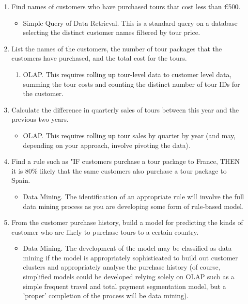 \documentclass{scrreprt}
\begin{document}
\begin{enumerate}
	\item Find names of customers who have purchased tours that cost less than €500.
	\begin{itemize}
		\item Simple Query of Data Retrieval. This is a standard query on a database selecting the distinct customer names filtered by tour price.
	\end{itemize}
	\item List the names of the customers, the number of tour packages that the customers have
	purchased, and the total cost for the tours.
	\begin{enumerate}
		\item OLAP. This requires rolling up tour-level data to customer level data, summing the tour costs and counting the distinct number of tour IDs for the customer.
	\end{enumerate}
	\item Calculate the difference in quarterly sales of tours between this year and the previous
	two years.
	\begin{itemize}
		\item OLAP. This requires rolling up tour sales by quarter by year (and may, depending on your approach, involve pivoting the data).
	\end{itemize}


	\item Find a rule such as "IF customers purchase a tour package to France, THEN it is 80\% likely
	that the same customers also purchase a tour package to Spain.
		\begin{itemize}
			\item Data Mining. The identification of an appropriate rule will involve the full data mining process as you are developing some form of rule-based model.
		\end{itemize}

	\item From the customer purchase history, build a model for predicting the kinds of customer who are likely to purchase tours to a certain country.

	\begin{itemize}
		\item Data Mining. The development of the model may be classified as data mining if the model is appropriately sophisticated to build out customer clusters and appropriately analyse the purchase history (of course, simplified models could be developed relying solely on OLAP such as a simple frequent travel and total payment segmentation model, but a 'proper' completion of the process will be data mining).
	\end{itemize}
\end{enumerate}
\end{document}
